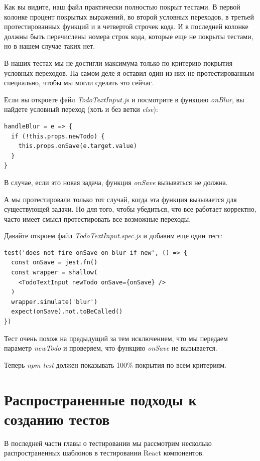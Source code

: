 Как вы видите, наш файл практически полностью покрыт тестами. В первой колонке процент покрытых выражений, во второй условных переходов, в третьей протестированных функций и в четвертой строчек кода. И в последней колонке должны быть перечислены номера строк кода, которые еще не покрыты тестами, но в нашем случае таких нет. 

В наших тестах мы не достигли максимума только по критерию покрытия условных переходов. На самом деле я оставил один из них не протестированным специально, чтобы мы могли сделать это сейчас.

Если вы откроете файл \textit{TodoTextInput.js} и посмотрите в функцию \textit{onBlur}, вы найдете условный переход (хоть и без ветки \textit{else}):

\begin{lstlisting}
handleBlur = e => {
  if (!this.props.newTodo) {
    this.props.onSave(e.target.value)
  }
}
\end{lstlisting}

В случае, если это новая задача, функция \textit{onSave} вызываться не должна. 

А мы протестировали только тот случай, когда эта функция вызывается для существующей задачи. Но для того, чтобы убедиться, что все работает корректно, часто имеет смысл протестировать все возможные переходы.

Давайте откроем файл \textit{TodoTextInput.spec.js} и добавим еще один тест:

\begin{lstlisting}
test('does not fire onSave on blur if new', () => {
  const onSave = jest.fn()
  const wrapper = shallow(
    <TodoTextInput newTodo onSave={onSave} />
  )
  wrapper.simulate('blur')
  expect(onSave).not.toBeCalled()
})
\end{lstlisting}

Тест очень похож на предыдущий за тем исключением, что мы передаем параметр \textit{newTodo} и проверяем, что функцию \textit{onSave} не вызывается.

Теперь \textit{npm test} должен показывать 100\% покрытия по всем критериям.

\section{Распространенные подходы к созданию тестов}

В последней части главы о тестировании мы рассмотрим несколько распространенных шаблонов в тестировании React компонентов.

